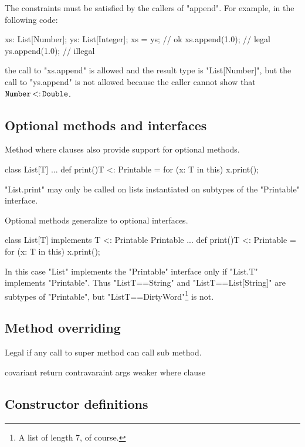 \documentclass[preprint,nocopyrightspace,9pt]{sigplanconf}
\begin{document}
The constraints must be satisfied by the callers of \xcd"append".
For example, in the following code:
\begin{xten}
xs: List[Number];
ys: List[Integer];
xs = ys; // ok
xs.append(1.0); // legal
ys.append(1.0); // illegal
\end{xten}
the call to \xcd"xs.append" is allowed and the result type is \xcd"List[Number]", but
the call to \xcd"ys.append" is not allowed because the caller cannot show that
${\tt Number} \subtype {\tt Double}$.

\subsection{Optional methods and interfaces}

Method where clauses also provide support for optional methods.

\begin{xten}
class List[T] {
    ...
    def print(){T <: Printable} = {
        for (x: T in this)
            x.print();
    }
}
\end{xten}

\xcd"List.print" may only be called on lists instantiated on
subtypes of the \xcd"Printable" interface.

Optional methods generalize to optional interfaces.

\begin{xten}
class List[T] implements {T <: Printable} Printable {
    ...
    def print(){T <: Printable} = {
        for (x: T in this)
            x.print();
    }
}
\end{xten}

In this case \xcd"List" implements the \xcd"Printable" interface
only if \xcd"List.T" implements \xcd"Printable".
Thus \xcd"List{T==String}"
and \xcd"List{T==List[String]}"
are subtypes of \xcd"Printable", but
\xcd"List{T==DirtyWord}"\footnote{A list of length 7, of course.} is not.

\subsection{Method overriding}

Legal if any call to super method can call sub method.

covariant return
contravaraint args
weaker where clause

\subsection{Constructor definitions}
\end{document}
